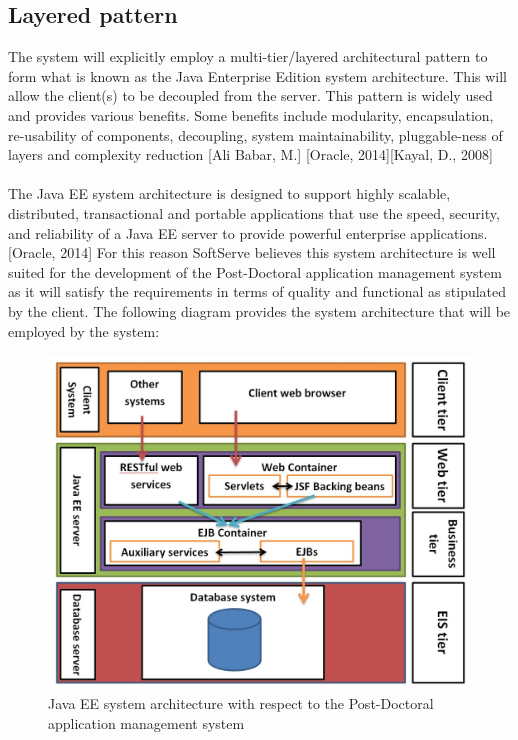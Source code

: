 \documentclass[12pt]{article}
\begin{document}
\subsection{Layered pattern}
The system will explicitly employ a multi-tier/layered architectural pattern to form what is known as the Java Enterprise Edition system architecture. This will allow the client(s) to be decoupled from the server. This pattern is widely used and provides various benefits. Some benefits include modularity, encapsulation, re-usability of components, decoupling, system maintainability, pluggable-ness of layers and complexity reduction [Ali Babar, M.] [Oracle, 2014][Kayal, D., 2008]\\
\\
The Java EE system architecture is designed to support highly scalable, distributed, transactional and portable applications that use the speed, security, and reliability of a Java EE server to provide powerful enterprise applications. [Oracle, 2014] For this reason SoftServe believes this system architecture is well suited for the development of the Post-Doctoral application management system as it will satisfy the requirements in terms of quality and functional as stipulated by the client. The following diagram provides the system architecture that will be employed by the system:\\

\begin{figure}[H]
\centering
\includegraphics[scale=0.6]{../Images_Docs/Diagrams/Architecture/Java EE system architecture.jpg}
\caption{Java EE system architecture with respect to the Post-Doctoral application management system}
\end{figure}
\end{document}
